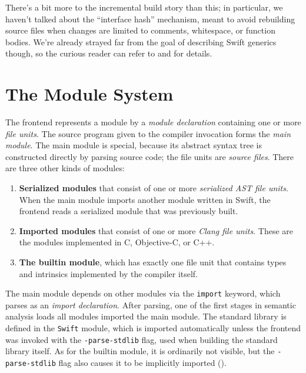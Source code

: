 \documentclass[../generics]{subfiles}
\begin{document}
There's a bit more to the incremental build story than this; in particular, we haven't talked about the ``interface hash'' mechanism, meant to avoid rebuilding source files when changes are limited to comments, whitespace, or function bodies. We're already strayed far from the goal of describing Swift generics though, so the curious reader can refer to \cite{reqeval} and \cite{incremental} for details.

\section{The Module System}\label{module system}

The frontend represents a module by a \emph{module declaration} containing one or more \emph{file units}. The source program given to the compiler invocation forms the \emph{main module}. The main module is special, because its abstract syntax tree is constructed directly by parsing source code; the file units are \emph{source files}. There are three other kinds of modules:
\begin{enumerate}
\item \textbf{Serialized modules} that consist of one or more \emph{serialized AST file units}. When the main module imports another module written in Swift, the frontend reads a serialized module that was previously built.

\item \textbf{Imported modules} that consist of one or more \emph{Clang file units}. These are the modules implemented in C, Objective-C, or C++.

\item \textbf{The builtin module}, which has exactly one file unit that contains types and intrinsics implemented by the compiler itself.
\end{enumerate}
The main module depends on other modules via the \texttt{import} keyword, which parses as an \emph{import declaration}. After parsing, one of the first stages in semantic analysis loads all modules imported the main module. The standard library is defined in the \texttt{Swift} module, which is imported automatically unless the frontend was invoked with the \texttt{-parse-stdlib} flag, used when building the standard library itself. As for the builtin module, it is ordinarily not visible, but the \texttt{-parse-stdlib} flag also causes it to be implicitly imported ().
\end{document}
